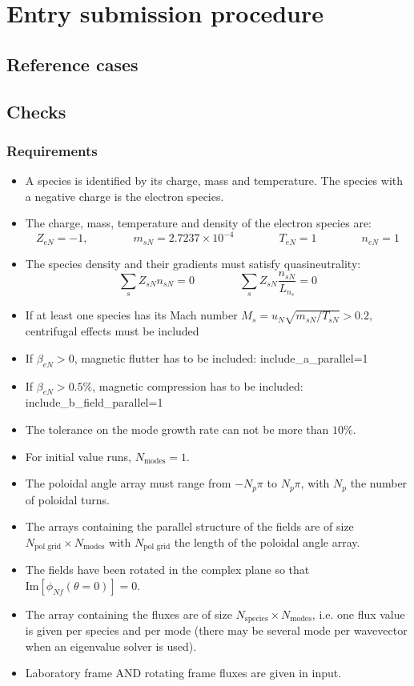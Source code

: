 \documentclass[fleqn]{report}
\begin{document}
\chapter{Entry submission procedure}
\section{Reference cases}

\section{Checks}
\subsection{Requirements}
\begin{itemize}
\item A species is identified by its charge, mass and temperature. The species with a negative charge is the electron species.
\item The charge, mass, temperature and density of the electron species are:
\begin{equation}
 Z_{eN}=-1, \qquad \qquad m_{sN} = 2.7237\times 10^{-4} \qquad \qquad T_{eN}=1 \qquad \qquad n_{eN}=1
\end{equation}
\item The species density and their gradients must satisfy quasineutrality:
\begin{equation}
 \sum_s Z_{sN}n_{sN} = 0 \qquad \qquad \sum_s Z_{sN}\frac{n_{sN}}{L_{n_s}}=0
\end{equation}
\item If at least one species has its Mach number $M_s=u_N\sqrt{m_{sN}/T_{sN}}>0.2$, centrifugal effects must be included
\item If $\beta_{eN}>0$, magnetic flutter has to be included: include\_a\_parallel=1
\item If $\beta_{eN}>0.5\%$, magnetic compression has to be included: include\_b\_field\_parallel=1
\item The tolerance on the mode growth rate can not be more than $10\%$.
\item For initial value runs, $N_\textrm{modes}=1$.
\item The poloidal angle array must range from $-N_p \pi$ to $N_p \pi$, with $N_p$ the number of poloidal turns.
\item The arrays containing the parallel structure of the fields are of size $N_\textrm{pol grid}\times N_\textrm{modes}$ with $N_\textrm{pol grid}$ the length of the poloidal angle array.
\item The fields have been rotated in the complex plane so that $\textrm{Im}\left[\phi_{Nf}(\theta=0)\right]=0$.

\item The array containing the fluxes are of size $N_\textrm{species}\times N_\textrm{modes}$, i.e. one flux value is given per species and per mode (there may be several mode per wavevector when an eigenvalue solver is used).
\item Laboratory frame AND rotating frame fluxes are given in input.
\end{itemize}
\end{document}
